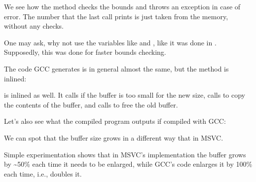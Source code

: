 

We see how the  
method checks the bounds and throws an exception in case of error.
The number that the last \printf call prints is just taken from the memory, without any checks.

One may ask, why not use the variables like  and , 
like it was done in .
Supposedly, this was done for faster bounds checking.


The code GCC generates is in general almost the same, but the  method is inlined:



 is inlined as well.
It calls  if the buffer is too small for the new size, calls  
to copy the contents of the buffer, and calls  to free the old buffer.

Let's also see what the compiled program outputs if compiled with GCC:



We can spot that the buffer size grows in a different way that in MSVC.

Simple experimentation shows that in MSVC's implementation the buffer grows by \textasciitilde{}50\% each time it needs to be enlarged,
while GCC's code enlarges it by 100\% each time, i.e., doubles it.

